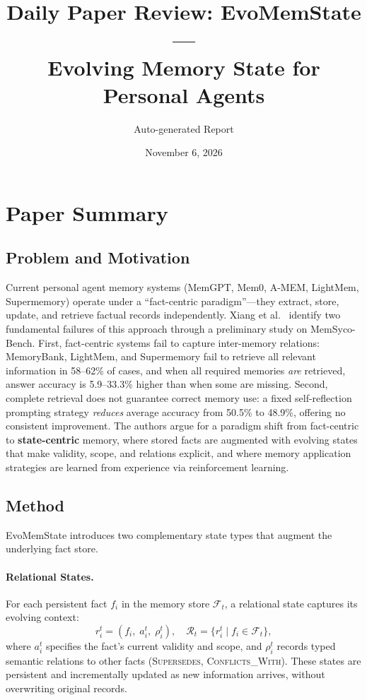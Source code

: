 \documentclass[11pt,a4paper]{article}
\title{Daily Paper Review: EvoMemState ---\\Evolving Memory State for Personal Agents}
\author{Auto-generated Report}
\date{November 6, 2026}
\begin{document}
\maketitle

\section{Paper Summary}

\subsection{Problem and Motivation}
Current personal agent memory systems (MemGPT, Mem0, A-MEM, LightMem, Supermemory) operate under a ``fact-centric paradigm''---they extract, store, update, and retrieve factual records independently. Xiang et al.~\cite{xiang2026evomemstate} identify two fundamental failures of this approach through a preliminary study on MemSyco-Bench. First, fact-centric systems fail to capture inter-memory relations: MemoryBank, LightMem, and Supermemory fail to retrieve all relevant information in 58--62\% of cases, and when all required memories \emph{are} retrieved, answer accuracy is 5.9--33.3\% higher than when some are missing. Second, complete retrieval does not guarantee correct memory use: a fixed self-reflection prompting strategy \emph{reduces} average accuracy from 50.5\% to 48.9\%, offering no consistent improvement. The authors argue for a paradigm shift from fact-centric to \textbf{state-centric} memory, where stored facts are augmented with evolving states that make validity, scope, and relations explicit, and where memory application strategies are learned from experience via reinforcement learning.

\subsection{Method}
EvoMemState introduces two complementary state types that augment the underlying fact store.

\paragraph{Relational States.}
For each persistent fact $f_i$ in the memory store $\mathcal{F}_t$, a relational state captures its evolving context:
\begin{equation}
  r_i^t = (f_i,\; a_i^t,\; \rho_i^t), \quad \mathcal{R}_t = \{r_i^t \mid f_i \in \mathcal{F}_t\},
\end{equation}
where $a_i^t$ specifies the fact's current validity and scope, and $\rho_i^t$ records typed semantic relations to other facts (\textsc{Supersedes}, \textsc{Conflicts\_With}). These states are persistent and incrementally updated as new information arrives, without overwriting original records.
\end{document}
